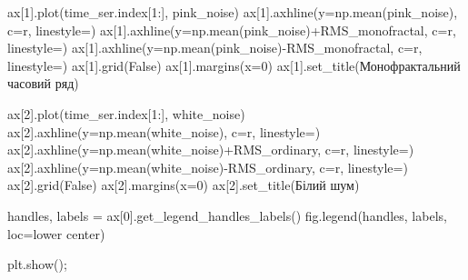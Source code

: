 \documentclass[
  letterpaper,
]{report}
\newenvironment{Shaded}{\begin{snugshade}}{\end{snugshade}}
\newcommand{\DecValTok}[1]{\textcolor[rgb]{0.68,0.00,0.00}{#1}}
\newcommand{\NormalTok}[1]{\textcolor[rgb]{0.00,0.23,0.31}{#1}}
\newcommand{\OperatorTok}[1]{\textcolor[rgb]{0.37,0.37,0.37}{#1}}
\newcommand{\StringTok}[1]{\textcolor[rgb]{0.13,0.47,0.30}{#1}}
\newcommand{\VariableTok}[1]{\textcolor[rgb]{0.07,0.07,0.07}{#1}}
\begin{document}
\begin{Shaded}
\begin{Highlighting}[]
\NormalTok{ax[}\DecValTok{1}\NormalTok{].plot(time\_ser.index[}\DecValTok{1}\NormalTok{:], pink\_noise)}
\NormalTok{ax[}\DecValTok{1}\NormalTok{].axhline(y}\OperatorTok{=}\NormalTok{np.mean(pink\_noise), c}\OperatorTok{=}\StringTok{\textquotesingle{}r\textquotesingle{}}\NormalTok{, linestyle}\OperatorTok{=}\StringTok{\textquotesingle{}{-}{-}\textquotesingle{}}\NormalTok{)}
\NormalTok{ax[}\DecValTok{1}\NormalTok{].axhline(y}\OperatorTok{=}\NormalTok{np.mean(pink\_noise)}\OperatorTok{+}\NormalTok{RMS\_monofractal, c}\OperatorTok{=}\StringTok{\textquotesingle{}r\textquotesingle{}}\NormalTok{, linestyle}\OperatorTok{=}\StringTok{\textquotesingle{}{-}\textquotesingle{}}\NormalTok{)}
\NormalTok{ax[}\DecValTok{1}\NormalTok{].axhline(y}\OperatorTok{=}\NormalTok{np.mean(pink\_noise)}\OperatorTok{{-}}\NormalTok{RMS\_monofractal, c}\OperatorTok{=}\StringTok{\textquotesingle{}r\textquotesingle{}}\NormalTok{, linestyle}\OperatorTok{=}\StringTok{\textquotesingle{}{-}\textquotesingle{}}\NormalTok{)}
\NormalTok{ax[}\DecValTok{1}\NormalTok{].grid(}\VariableTok{False}\NormalTok{)}
\NormalTok{ax[}\DecValTok{1}\NormalTok{].margins(x}\OperatorTok{=}\DecValTok{0}\NormalTok{)}
\NormalTok{ax[}\DecValTok{1}\NormalTok{].set\_title(}\StringTok{\textquotesingle{}Монофрактальний часовий ряд\textquotesingle{}}\NormalTok{)}

\NormalTok{ax[}\DecValTok{2}\NormalTok{].plot(time\_ser.index[}\DecValTok{1}\NormalTok{:], white\_noise)}
\NormalTok{ax[}\DecValTok{2}\NormalTok{].axhline(y}\OperatorTok{=}\NormalTok{np.mean(white\_noise), c}\OperatorTok{=}\StringTok{\textquotesingle{}r\textquotesingle{}}\NormalTok{, linestyle}\OperatorTok{=}\StringTok{\textquotesingle{}{-}{-}\textquotesingle{}}\NormalTok{)}
\NormalTok{ax[}\DecValTok{2}\NormalTok{].axhline(y}\OperatorTok{=}\NormalTok{np.mean(white\_noise)}\OperatorTok{+}\NormalTok{RMS\_ordinary, c}\OperatorTok{=}\StringTok{\textquotesingle{}r\textquotesingle{}}\NormalTok{, linestyle}\OperatorTok{=}\StringTok{\textquotesingle{}{-}\textquotesingle{}}\NormalTok{)}
\NormalTok{ax[}\DecValTok{2}\NormalTok{].axhline(y}\OperatorTok{=}\NormalTok{np.mean(white\_noise)}\OperatorTok{{-}}\NormalTok{RMS\_ordinary, c}\OperatorTok{=}\StringTok{\textquotesingle{}r\textquotesingle{}}\NormalTok{, linestyle}\OperatorTok{=}\StringTok{\textquotesingle{}{-}\textquotesingle{}}\NormalTok{)}
\NormalTok{ax[}\DecValTok{2}\NormalTok{].grid(}\VariableTok{False}\NormalTok{)}
\NormalTok{ax[}\DecValTok{2}\NormalTok{].margins(x}\OperatorTok{=}\DecValTok{0}\NormalTok{)}
\NormalTok{ax[}\DecValTok{2}\NormalTok{].set\_title(}\StringTok{\textquotesingle{}Білий шум\textquotesingle{}}\NormalTok{)}

\NormalTok{handles, labels }\OperatorTok{=}\NormalTok{ ax[}\DecValTok{0}\NormalTok{].get\_legend\_handles\_labels()}
\NormalTok{fig.legend(handles, labels, loc}\OperatorTok{=}\StringTok{\textquotesingle{}lower center\textquotesingle{}}\NormalTok{)}

\NormalTok{plt.show()}\OperatorTok{;}
\end{Highlighting}
\end{Shaded}
\end{document}
